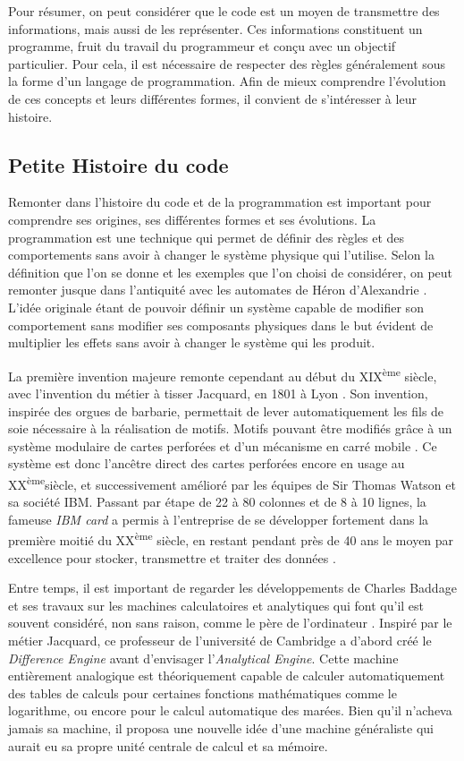 \documentclass[12pt]{article} %
\newcommand{\ts}{\textsuperscript} %
\begin{document}
Pour résumer, on peut considérer que le code est un moyen de transmettre des informations, mais aussi de les représenter. Ces informations constituent un programme, fruit du travail du programmeur et conçu avec un objectif particulier. Pour cela, il est nécessaire de respecter des règles généralement sous la forme d'un langage de programmation. Afin de mieux comprendre l'évolution de ces concepts et leurs différentes formes, il convient de s'intéresser à leur histoire.

\subsection{Petite Histoire du code}
Remonter dans l'histoire du code et de la programmation est important pour comprendre ses origines, ses différentes formes et ses évolutions. La programmation est une technique qui permet de définir des règles et des comportements sans avoir à changer le système physique qui l'utilise. Selon la définition que l'on se donne et les exemples que l'on choisi de considérer, on peut remonter jusque dans l'antiquité avec les automates de Héron d'Alexandrie \cite{View_all_of_Hansels_posts2018-uw}. L'idée originale étant de pouvoir définir un système capable de modifier son comportement sans modifier ses composants physiques dans le but évident de multiplier les effets sans avoir à changer le système qui les produit.

La première invention majeure remonte cependant au début du XIX\ts{ème} siècle, avec l'invention du métier à tisser Jacquard, en 1801 à Lyon \cite{RDigest1982}. Son invention, inspirée des orgues de barbarie, permettait de lever automatiquement les fils de soie nécessaire à la réalisation de motifs. Motifs pouvant être modifiés grâce à un système modulaire de cartes perforées et d'un mécanisme en carré mobile \cite{noauthor_2009-bf}. Ce système est donc l'ancêtre direct des cartes perforées encore en usage au XX\ts{ème}siècle, et successivement amélioré par les équipes de Sir Thomas Watson et sa société IBM. Passant par étape de 22 à 80 colonnes et de 8 à 10 lignes, la fameuse \textit{IBM card} a permis à l'entreprise de se développer fortement dans la première moitié du XX\ts{ème} siècle, en restant pendant près de 40 ans le moyen par excellence pour stocker, transmettre et traiter des données \cite{noauthor_2012-xq}.

Entre temps, il est important de regarder les développements de Charles Baddage et ses travaux sur les machines calculatoires et analytiques qui font qu'il est souvent considéré, non sans raison, comme le père de l'ordinateur \cite{Copeland2020-my}. Inspiré par le métier Jacquard, ce professeur de l'université de Cambridge a d'abord créé le \textit{Difference Engine} avant d'envisager l'\textit{Analytical Engine}. Cette machine entièrement analogique est théoriquement capable de calculer automatiquement des tables de calculs pour certaines fonctions mathématiques comme le logarithme, ou encore pour le calcul automatique des marées. Bien qu'il n'acheva jamais sa machine, il proposa une nouvelle idée d'une machine généraliste qui aurait eu sa propre unité centrale de calcul et sa mémoire. 
\end{document}
